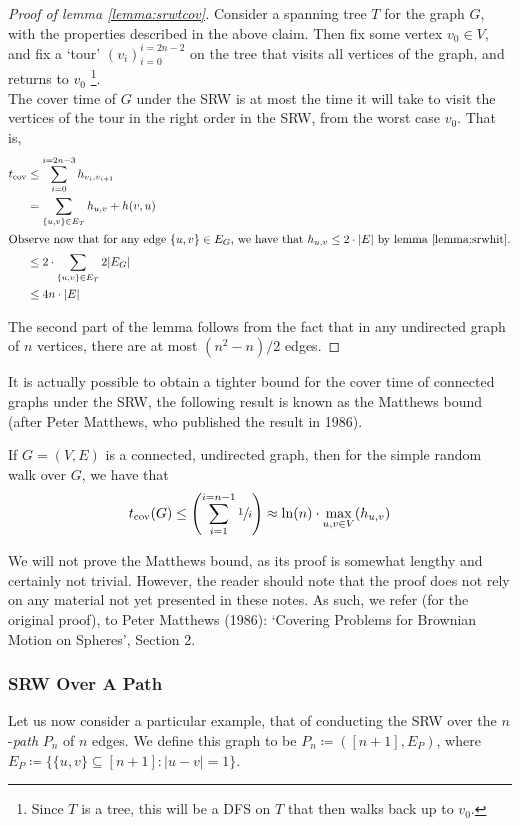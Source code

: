 	\begin{proof}[Proof of lemma \ref{lemma:srwtcov}]
		Consider a spanning tree $T$ for the graph $G$, with the properties described in 
		the above claim. Then fix some vertex $v_0 \in V$, and fix a `tour' $(v_i)_{i=0}^
		{i=2n-2}$ on the tree that visits all vertices of the graph, and returns to $v_0$
		\footnote{Since $T$ is a tree, this will be a DFS on $T$ that then walks back up 
		to $v_0$.}. \\
		The cover time of $G$ under the SRW is at most the time it will take to visit the 
		vertices of the tour in the right order in the SRW, from the worst case $v_0$. That
		is,
		\begin{align*}
			t_\mathrm{cov} &\leq \sum_{i=0}^{i=2n-3} h_{v_i, v_{i+1}} \\
			&=\sum_{\{u,v\}\in E_T} h_{u,v} + h(v,u) \\
		\intertext{Observe now that for any edge $\{u,v\} \in E_G$, we have that $h_{u,v} 
		\leq 2\cdot|E|$ by lemma \ref{lemma:srwhit}.}
			&\leq 2 \cdot \sum_{\{u,v\}\in E_T} 2 |E_G| \\
			&\leq 4n \cdot |E|
		\end{align*}

		The second part of the lemma follows from the fact that in any undirected graph
		of $n$ vertices, there are at most $(n^2 - n)/2$ edges.
	\end{proof}

	It is actually possible to obtain a tighter bound for the cover time of connected graphs 
	under the SRW, the following result is known as the Matthews bound (after Peter Matthews,
	who published the result in 1986).
	\begin{theorem}
		If $G =(V,E)$ is a connected, undirected graph, then for the simple random walk 
		over $G$, we have that
		$$
		t_\mathrm{cov}(G) \leq \left(\sum_{i=1}^{i=n-1} \sfrac{1}{i}\right) \approx
		\ln(n) \cdot \max_{u,v\in V}(h_{u,v})
		$$
	\end{theorem}
	We will not prove the Matthews bound, as its proof is somewhat lengthy and certainly not 
	trivial. However, the reader should note that the proof does not rely on any material not 
	yet presented in these notes. As such, we refer (for the original proof), to Peter 
	Matthews (1986): `Covering Problems for Brownian Motion on Spheres', Section 2.

	\subsubsection{SRW Over A Path}
	Let us now consider a particular example, that of conducting the SRW over the 
	$n$-\emph{path} $P_n$ of $n$ edges. We define this graph to be $P_n\coloneqq([n+1],E_P)$, 
	where $E_P \coloneqq \{\{u,v\} \subseteq [n+1] : |u-v| = 1\}$.
	
